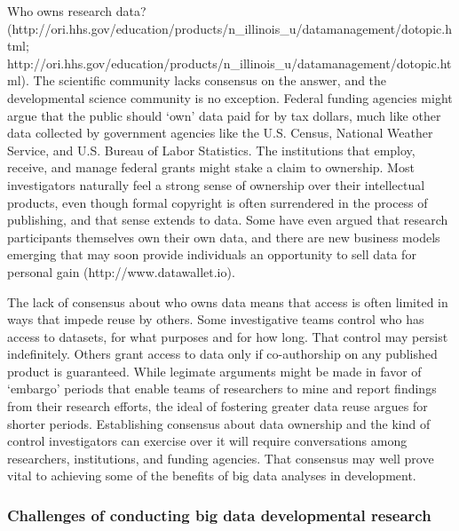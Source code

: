 \documentclass[letterpaper,man,apacite]{apa6}
\begin{document}
Who owns research data? (http://ori.hhs.gov/education/products/n_illinois_u/datamanagement/dotopic.html; http://ori.hhs.gov/education/products/n_illinois_u/datamanagement/dotopic.html).
The scientific community lacks consensus on the answer, and the developmental science community is no exception.
Federal funding agencies might argue that the public should `own' data paid for by tax dollars, much like other data collected by government agencies like the U.S. Census, National Weather Service, and U.S. Bureau of Labor Statistics.
The institutions that employ, receive, and manage federal grants might stake a claim to ownership.
Most investigators naturally feel a strong sense of ownership over their intellectual products, even though formal copyright is often surrendered in the process of publishing, and that sense extends to data.
Some have even argued that research participants themselves own their own data, and there are new business models emerging that may soon provide individuals an opportunity to sell data for personal gain (http://www.datawallet.io).

The lack of consensus about who owns data means that access is often limited in ways that impede reuse by others.
Some investigative teams control who has access to datasets, for what purposes and for how long.
That control may persist indefinitely.
Others grant access to data only if co-authorship on any published product is guaranteed.
While legimate arguments might be made in favor of `embargo' periods that enable teams of researchers to mine and report findings from their research efforts, the ideal of fostering greater data reuse argues for shorter periods.
Establishing consensus about data ownership and the kind of control investigators can exercise over it will require conversations among researchers, institutions, and funding agencies.
That consensus may well prove vital to achieving some of the benefits of big data analyses in development. 

\subsubsection{Challenges of conducting big data developmental research}
\end{document}
